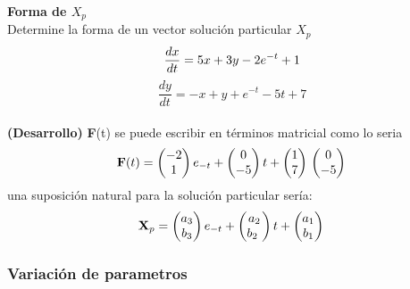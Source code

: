\documentclass[11.5pt]{article}
\begin{document}
\textbf{Forma de $X_p$}\\
Determine la forma de un vector solución particular $X_p$
\vspace{0.6cm}\\
$$\frac{dx}{dt}=5x+3y-2e^{-t}+1\\$$
$$\frac{dy}{dt}=-x+y+e^{-t}-5t+7$$
\vspace{0.6cm}\\
\textbf{(Desarrollo)}  \textbf {F}(t)  se puede escribir en términos  matricial como lo seria \\
\begin{equation}
\left.
\textbf{F}(t)=\begin{pmatrix}
-2\\
 1\\
\end{pmatrix}
e_{-t} +
\begin{pmatrix}
0\\ 
-5\\  
\end{pmatrix}\\
t+
\begin{pmatrix}
1\\ 
7\\  
\end{pmatrix}\\
\begin{pmatrix}
0\\ 
-5\\  
\end{pmatrix}\\
\right.
\end{equation}
una suposición natural para la  solución particular sería:\\
$$
\textbf{X}_p=\begin{pmatrix}
a_3\\
 b_3\\
\end{pmatrix}
e_{-t} +
\begin{pmatrix}
a_2\\ 
b_2\  
\end{pmatrix}\\
t+
\begin{pmatrix}
a_1\\ 
b_1\\  
\end{pmatrix}\\$$
\subsubsection{Variación de parametros}
\end{document}
